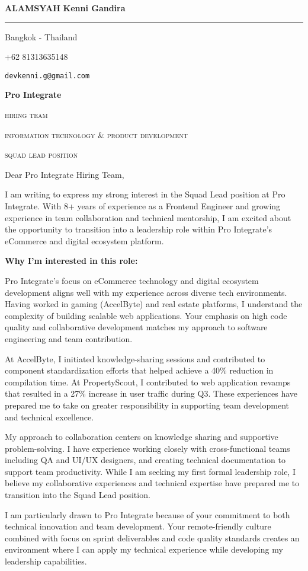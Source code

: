 \documentclass[12pt]{article}
\newcommand{\firstname}{Kenni Gandira}
\newcommand{\lastname}{Alamsyah}
\newcommand{\mainColor}{redBlood} %
\newlength{\spacebox}
\newcommand{\shspace}{\hspace*{0.8em}}
\newcommand{\xvspace}{\vspace*{0.1em}}
\newcommand{\svspace}{\vspace*{0.5em}}
\newcommand{\mvspace}{\vspace*{1.5em}}
\newcommand{\negmvspace}{\vspace*{-1em}}
\newcommand{\userInfo}[4]{
    \begin{flushleft}
        \color{\mainColor}
        \Huge
        \textbf{\MakeUppercase{\lastname}}
        \color{black}
        \textbf{\firstname}
        \color{\mainColor}
        \noindent\rule{19.1cm}{0.8pt}
        \color{grayShy}
        \small
        \par
        \parbox{7\spacebox} {
            \faMap \shspace #1 - #2 \par \svspace
            \faPhone \shspace #3 \par \svspace
            \faEnvelopeOpen \shspace \texttt{#4} \par \svspace
        }
        \color{\mainColor}
        \mvspace
    \end{flushleft}
    \negmvspace
}
\newcommand{\companyInfo}[4]{
    \begin{flushright}
        \parbox{4\spacebox}{
            \raggedleft
            \small
            \textbf{#1}\par
            \mvspace
            \color{grayShy} \textsc{\MakeLowercase{#2}}\par
            \xvspace
            \textsc{\MakeLowercase{#3}}\par
            \xvspace
            \textsc{\MakeLowercase{#4}}\par
            \color{black}
        }
    \end{flushright}
    \negmvspace
}
\begin{document}
\userInfo{Bangkok}{Thailand}{+62 81313635148}{devkenni.g@gmail.com}

\companyInfo{Pro Integrate}{Hiring Team}{Information Technology \& Product Development}{Squad Lead Position}

\mvspace

Dear Pro Integrate Hiring Team,

\svspace

I am writing to express my strong interest in the Squad Lead position at Pro Integrate. With 8+ years of experience as a Frontend Engineer and growing experience in team collaboration and technical mentorship, I am excited about the opportunity to transition into a leadership role within Pro Integrate's eCommerce and digital ecosystem platform.

\svspace

\textbf{Why I'm interested in this role:}

\svspace

Pro Integrate's focus on eCommerce technology and digital ecosystem development aligns well with my experience across diverse tech environments. Having worked in gaming (AccelByte) and real estate platforms, I understand the complexity of building scalable web applications. Your emphasis on high code quality and collaborative development matches my approach to software engineering and team contribution.

\svspace

At AccelByte, I initiated knowledge-sharing sessions and contributed to component standardization efforts that helped achieve a 40\% reduction in compilation time. At PropertyScout, I contributed to web application revamps that resulted in a 27\% increase in user traffic during Q3. These experiences have prepared me to take on greater responsibility in supporting team development and technical excellence.

\svspace

My approach to collaboration centers on knowledge sharing and supportive problem-solving. I have experience working closely with cross-functional teams including QA and UI/UX designers, and creating technical documentation to support team productivity. While I am seeking my first formal leadership role, I believe my collaborative experiences and technical expertise have prepared me to transition into the Squad Lead position.

\svspace

I am particularly drawn to Pro Integrate because of your commitment to both technical innovation and team development. Your remote-friendly culture combined with focus on sprint deliverables and code quality standards creates an environment where I can apply my technical experience while developing my leadership capabilities.
\end{document}
